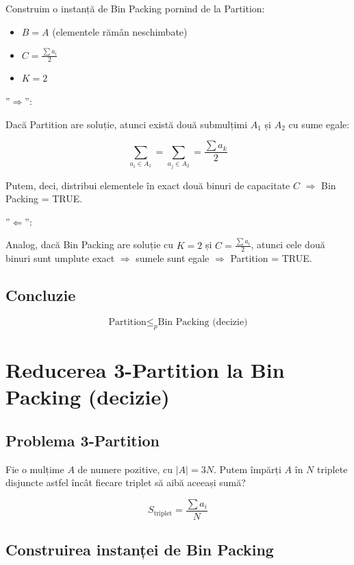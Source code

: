 \documentclass[runningheads]{llncs}
\begin{document}
	Construim o instanță de Bin Packing pornind de la Partition:

	\begin{itemize}
		\item $B = A$ (elementele rămân neschimbate)
		\item $C = \frac{\sum a_i}{2}$
		\item $K = 2$
	\end{itemize}

	{\Large ''$\Rightarrow$'':}

	Dacă Partition are soluție, atunci există două submulțimi $A_1$ și $A_2$ cu sume egale:


	\[
	\sum_{a_i \in A_1} = \sum_{a_j \in A_2} = \frac{\sum a_k}{2}
	\]


	Putem, deci, distribui elementele în exact două binuri de capacitate $C$ $\Rightarrow$ Bin Packing = TRUE.

	{\Large ''$\Leftarrow$'':}

	Analog, dacă Bin Packing are soluție cu $K = 2$ și $C = \frac{\sum a_i}{2}$, atunci cele două binuri sunt umplute exact $\Rightarrow$ sumele sunt egale $\Rightarrow$ Partition = TRUE.

	\subsection{Concluzie}



	\[
	\text{Partition} \le_p \text{Bin Packing (decizie)}
	\]



	\pagebreak

	\section{Reducerea 3-Partition la Bin Packing (decizie)}

	\subsection{Problema 3-Partition}

	Fie o mulțime $A$ de numere pozitive, cu $|A| = 3N$. Putem împărți $A$ în $N$ triplete disjuncte astfel încât fiecare triplet să aibă aceeași sumă?



	\[
	S_{\text{triplet}} = \frac{\sum a_i}{N}
	\]



	\subsection{Construirea instanței de Bin Packing}
\end{document}
